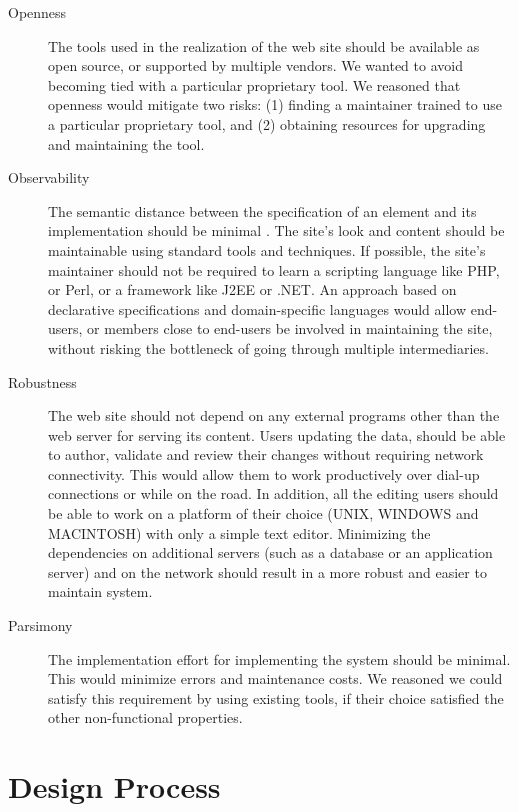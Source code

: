 \documentclass[10pt]{article}
\begin{document}
\begin{description}
\item[Openness] The tools used in the realization of the web site
should be available as open source, or supported by multiple vendors.
We wanted to avoid becoming tied with a particular proprietary
tool.
We reasoned that openness would mitigate two risks:
(1) finding a maintainer trained to use a particular proprietary tool,
and (2) obtaining resources for upgrading and maintaining the tool.

\item[Observability]
The semantic distance between
the specification of an element and its implementation 
should be minimal \cite{SG97}.
The site's look and content should be maintainable
using standard tools and techniques.
If possible, the site's maintainer should not be required to
learn a scripting language like {\sc PHP}, or {\sc Perl}, or
a framework like {\sc J2EE} or {\sc .NET}.
An approach based on declarative specifications \cite{FFLS00} and
domain-specific languages \cite{DKV00} \cite{Spi00b} would allow end-users, or members
close to end-users be involved in maintaining the site,
without risking the bottleneck of going through
multiple intermediaries.

\item[Robustness] The web site should not depend on
any external programs other than the web server for serving
its content.
Users updating the data, should be able to author, validate and 
review their changes without requiring network connectivity.
This would allow them to work productively over dial-up connections
or while on the road. In addition, all the editing users should be able 
to work on a platform of their choice ({\sc UNIX}, {\sc WINDOWS} and {\sc MACINTOSH}) 
with only a simple text editor.
Minimizing the dependencies on additional servers (such as a
database or an application server) and on the network
should result in a more robust and easier to maintain system.   

\item[Parsimony] The implementation effort for
implementing the system should be minimal.
This would minimize errors and maintenance costs.
We reasoned we could satisfy this requirement by
using existing tools, if their choice satisfied the
other non-functional properties.
\end{description} 

\section{Design Process}
\end{document}

